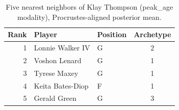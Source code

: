 \begin{table}[htbp]
  \centering\small
  \begin{tabular}{rllc}
    \toprule
    Rank & Player & Position & Archetype \\
    \midrule
    1 & Lonnie Walker IV & G & 2 \\
    2 & Voshon Lenard & G & 1 \\
    3 & Tyrese Maxey & G & 1 \\
    4 & Keita Bates-Diop & F & 1 \\
    5 & Gerald Green & G & 3 \\
    \bottomrule
  \end{tabular}
  \caption{Five nearest neighbors of Klay Thompson (peak_age modality), Procrustes-aligned posterior mean.}
  \label{tab:Klay_Thompson_neighbors_peak_age}
\end{table}

